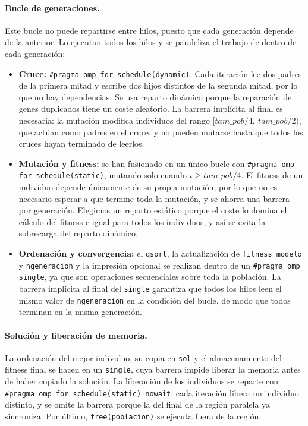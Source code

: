 \documentclass[12pt]{article}
\begin{document}
\begin{enumerate}
\paragraph{Bucle de generaciones.}
Este bucle no puede repartirse entre hilos, puesto que cada generación depende de la anterior. Lo ejecutan todos los hilos y se paraleliza el trabajo de dentro de cada generación:
\begin{itemize}
	\item \textbf{Cruce:} \texttt{\#pragma omp for schedule(dynamic)}. Cada iteración lee dos padres de la primera mitad y escribe dos hijos distintos de la segunda mitad, por lo que no hay dependencias. Se usa reparto dinámico porque la reparación de genes duplicados tiene un coste aleatorio. La barrera implícita al final es necesaria: la mutación modifica individuos del rango $[tam\_pob/4,\ tam\_pob/2)$, que actúan como padres en el cruce, y no pueden mutarse hasta que todos los cruces hayan terminado de leerlos.
	\item \textbf{Mutación y fitness:} se han fusionado en un único bucle con \texttt{\#pragma omp for schedule(static)}, mutando solo cuando $i \geq tam\_pob/4$. El fitness de un individuo depende únicamente de su propia mutación, por lo que no es necesario esperar a que termine toda la mutación, y se ahorra una barrera por generación. Elegimos un reparto estático porque el coste lo domina el cálculo del fitness e igual para todos los individuos, y así se evita la sobrecarga del reparto dinámico.
	\item \textbf{Ordenación y convergencia:} el \texttt{qsort}, la actualización de \texttt{fitness\_modelo} y \texttt{ngeneracion} y la impresión opcional se realizan dentro de un \texttt{\#pragma omp single}, ya que son operaciones secuenciales sobre toda la población. La barrera implícita al final del \texttt{single} garantiza que todos los hilos leen el mismo valor de \texttt{ngeneracion} en la condición del bucle, de modo que todos terminan en la misma generación.
\end{itemize}

\paragraph{Solución y liberación de memoria.}
La ordenación del mejor individuo, su copia en \texttt{sol} y el almacenamiento del fitness final se hacen en un \texttt{single}, cuya barrera impide liberar la memoria antes de haber copiado la solución. La liberación de los individuos se reparte con \texttt{\#pragma omp for schedule(static) nowait}: cada iteración libera un individuo distinto, y se omite la barrera porque la del final de la región paralela ya sincroniza. Por último, \texttt{free(poblacion)} se ejecuta fuera de la región.


\end{enumerate}
\end{document}
